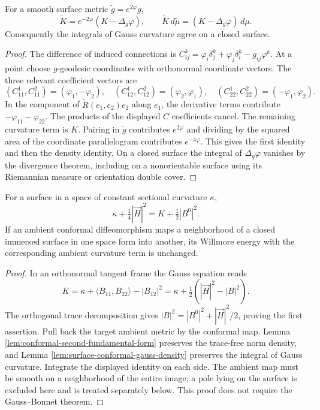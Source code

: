 \begin{lemma}\label{lem:surface-conformal-gauss-density}
For a smooth surface metric $\widetilde g=e^{2\varphi}g$,
\[
 \widetilde K=e^{-2\varphi}(K-\Delta_g\varphi),\qquad
 \widetilde K\,d\widetilde\mu=(K-\Delta_g\varphi)\,d\mu.
\]
Consequently the integrals of Gauss curvature agree on a closed surface.
\end{lemma}
\begin{proof}
The difference of induced connections is
$C_{ij}^{k}=\varphi_i\delta_j^k+\varphi_j\delta_i^k-g_{ij}\varphi^k$.
At a point choose $g$-geodesic coordinates with orthonormal coordinate vectors. The three relevant coefficient vectors are
\[
 (C_{11}^1,C_{11}^2)=(\varphi_1,-\varphi_2),\quad
 (C_{12}^1,C_{12}^2)=(\varphi_2,\varphi_1),\quad
 (C_{22}^1,C_{22}^2)=(-\varphi_1,\varphi_2).
\]
In the component of $\widetilde R(e_1,e_2)e_2$ along $e_1$, the derivative terms contribute $-\varphi_{11}-\varphi_{22}$. The products of the displayed $C$ coefficients cancel. The remaining curvature term is $K$. Pairing in $\widetilde g$ contributes $e^{2\varphi}$ and dividing by the squared area of the coordinate parallelogram contributes $e^{-4\varphi}$. This gives the first identity and then the density identity. On a closed surface the integral of $\Delta_g\varphi$ vanishes by the divergence theorem, including on a nonorientable surface using its Riemannian measure or orientation double cover.
\end{proof}

\begin{proposition}\label{prop:willmore-tracefree-decomposition}
For a surface in a space of constant sectional curvature $\kappa$,
\[
 \kappa+\tfrac14|\vec H|^2=K+\tfrac12|B^0|^2.
\]
If an ambient conformal diffeomorphism maps a neighborhood of a closed immersed surface in one space form into another, its Willmore energy with the corresponding ambient curvature term is unchanged.
\end{proposition}
\begin{proof}
In an orthonormal tangent frame the Gauss equation reads
\[
 K=\kappa+\langle B_{11},B_{22}\rangle-|B_{12}|^2
 =\kappa+\tfrac12(|\vec H|^2-|B|^2).
\]
The orthogonal trace decomposition gives $|B|^2=|B^0|^2+|\vec H|^2/2$, proving the first assertion. Pull back the target ambient metric by the conformal map. Lemma \ref{lem:conformal-second-fundamental-form} preserves the trace-free norm density, and Lemma \ref{lem:surface-conformal-gauss-density} preserves the integral of Gauss curvature. Integrate the displayed identity on each side. The ambient map must be smooth on a neighborhood of the entire image; a pole lying on the surface is excluded here and is treated separately below. This proof does not require the Gauss--Bonnet theorem.
\end{proof}

